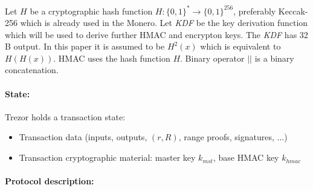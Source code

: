 \documentclass[]{article}
\begin{document}
Let $H$ be a cryptographic hash function $H : \{0,1\}^* \rightarrow \{0,1\}^{256}$, preferably Keccak-256 which is already used in the Monero. Let \emph{KDF} be the key derivation function which will be used to derive further HMAC and encrypton keys. The \emph{KDF} has 32 B output. In this paper it is assumed to be $H^2(x)$ which is equivalent to $H(H(x))$. HMAC uses the hash function $H$. Binary operator $||$ is a binary concatenation.

\paragraph{State:}
Trezor holds a transaction state:
\begin{itemize}
	\item Transaction data (inputs, outputs, $(r,R)$, range proofs, signatures, $\dots$)
	\item Transaction cryptographic material: master key $k_{mst}$, base HMAC key $k_{hmac}$
\end{itemize}

\paragraph{Protocol description:}
\end{document}
